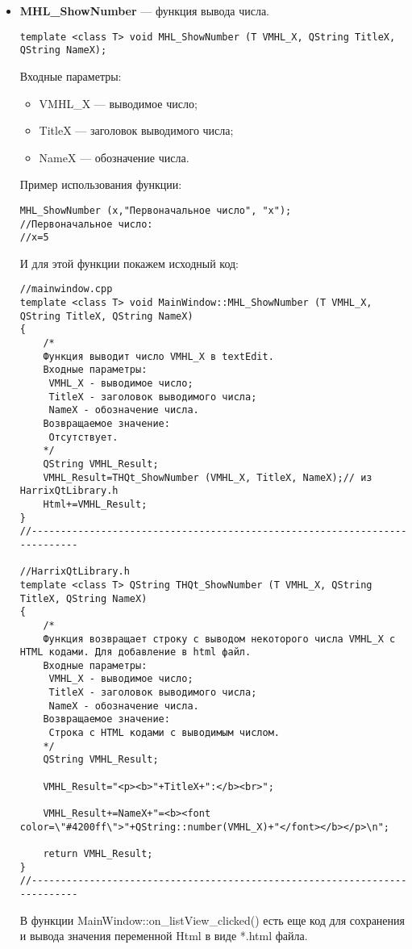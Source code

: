 \begin{itemize}
\item \textbf{MHL\_ShowNumber} --- функция вывода числа. 
\begin{lstlisting}[label=examplefunction13, caption=Синтаксис функции MHL\_ShowNumber]
template <class T> void MHL_ShowNumber (T VMHL_X, QString TitleX, QString NameX);
\end{lstlisting}
Входные параметры: 
\begin{itemize}   
    \item  VMHL\_X --- выводимое число;
     \item TitleX --- заголовок выводимого числа;
     \item NameX --- обозначение числа.
\end{itemize}
Пример использования функции:
\begin{lstlisting}[label=examplefunction10, caption=Пример использования MHL\_ShowNumber]
MHL_ShowNumber (x,"Первоначальное число", "x");
//Первоначальное число:
//x=5
\end{lstlisting}
И для этой функции покажем исходный код:
\begin{lstlisting}[label=examplefunction11, caption=Реализация функции MHL\_ShowNumber]
//mainwindow.cpp
template <class T> void MainWindow::MHL_ShowNumber (T VMHL_X, QString TitleX, QString NameX)
{
    /*
    Функция выводит число VMHL_X в textEdit.
    Входные параметры:
     VMHL_X - выводимое число;
     TitleX - заголовок выводимого числа;
     NameX - обозначение числа.
    Возвращаемое значение:
     Отсутствует.
    */
    QString VMHL_Result;
    VMHL_Result=THQt_ShowNumber (VMHL_X, TitleX, NameX);// из HarrixQtLibrary.h
    Html+=VMHL_Result;
}
//---------------------------------------------------------------------------

//HarrixQtLibrary.h
template <class T> QString THQt_ShowNumber (T VMHL_X, QString TitleX, QString NameX)
{
    /*
    Функция возвращает строку с выводом некоторого числа VMHL_X с HTML кодами. Для добавление в html файл.
    Входные параметры:
     VMHL_X - выводимое число;
     TitleX - заголовок выводимого числа;
     NameX - обозначение числа.
    Возвращаемое значение:
     Строка с HTML кодами с выводимым числом.
    */
    QString VMHL_Result;

    VMHL_Result="<p><b>"+TitleX+":</b><br>";

    VMHL_Result+=NameX+"=<b><font color=\"#4200ff\">"+QString::number(VMHL_X)+"</font></b></p>\n";

    return VMHL_Result;
}
//---------------------------------------------------------------------------
\end{lstlisting}
В функции MainWindow::on\_listView\_clicked() есть еще код для сохранения и вывода значения переменной Html в виде *.html файла.


\end{itemize}
